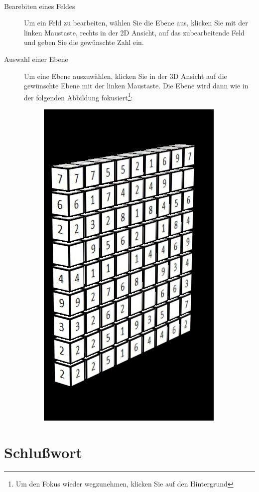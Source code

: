 \documentclass[a4paper,12pt]{scrreprt}
\begin{document}
\begin{description}
\begin{figure}[h]
			\end{figure}\\
		\item[Bearebiten eines Feldes] Um ein Feld zu bearbeiten, w\"ahlen Sie die Ebene aus, klicken Sie mit der linken
			Maustaste, rechts in der 2D Ansicht, auf das zubearbeitende Feld und geben Sie die gew\"unschte Zahl ein.
		\item[Auswahl einer Ebene] Um eine Ebene auszuw\"ahlen, klicken Sie in der 3D Ansicht auf die gew\"unschte
			Ebene mit der linken Maustaste. Die Ebene wird dann wie in der folgenden Abbildung fokusiert\footnote{
			Um den Fokus wieder wegzunehmen, klicken Sie auf den Hintergrund}:\\
			\begin{figure}[h]
				\includegraphics[scale=1]{pictures/layerfocus_example}
			\end{figure}
	\end{description}

	\chapter{Schlu{\ss}wort}
\end{document}
